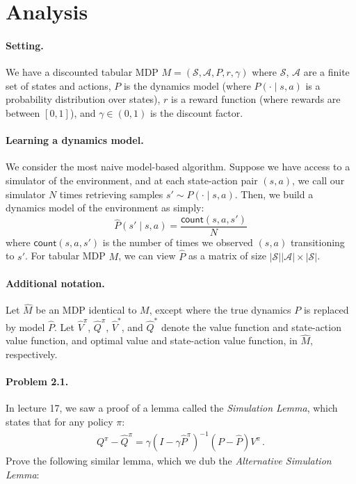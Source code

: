\section{Analysis}

\paragraph{Setting.} We have a discounted tabular MDP $M =(\mathcal{S}, \mathcal{A}, P, r, \gamma)$ where $\mathcal{S}$, $\mathcal{A}$ are a finite set of states and actions, $P$ is the dynamics model (where $P(\cdot \mid s, a)$ is a probability distribution over states), $r$ is a reward function (where rewards are between $[0, 1]$), and $\gamma \in (0, 1)$ is the discount factor. 


\paragraph{Learning a dynamics model.} We consider the most naive model-based algorithm. Suppose we have access to a simulator of the environment, and at each state-action pair $(s, a)$, we call our simulator $N$ times retrieving samples $s' \sim P(\cdot \mid s, a)$. Then, we build a dynamics model of the environment as simply:
$$
\widehat{P}(s' \mid s, a) = \frac{\mathsf{count}(s, a, s')}{N}
$$
where $\mathsf{count}(s, a, s')$ is the number of times we observed $(s, a)$ transitioning to $s'$. 
For tabular MDP $M$, we can view $\widehat{P}$ as a matrix of size $|\mathcal{S}||\mathcal{A}| \times |\mathcal{S}|$. 

\paragraph{Additional notation.} Let $\widehat{M}$ be an MDP identical to $M$, except where the true dynamics $P$ is replaced by model $\widehat{P}$. Let $\widehat{V}^\pi$, $\widehat{Q}^\pi$, $\widehat{V}^*$, and $\widehat{Q}^*$ denote the value function and state-action value function, and optimal value and state-action value function, in $\widehat{M}$, respectively. 


\paragraph{Problem 2.1.} 
In lecture 17, we saw a proof of a lemma called the \emph{Simulation Lemma}, which states that for any policy $\pi$:
\begin{align*}
Q^\pi - \widehat{Q}^\pi = \gamma(I - \gamma \widehat{P}^\pi)^{-1} (P - \widehat{P}) V^\pi\,.
\end{align*}
Prove the following similar lemma, which we dub the \emph{Alternative Simulation Lemma}:

